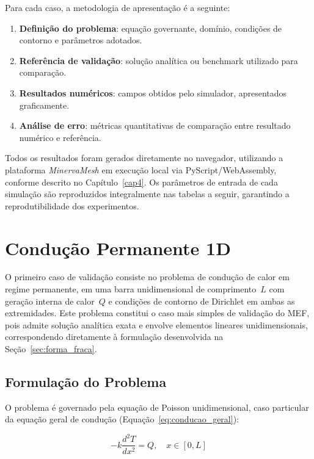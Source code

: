 Para cada caso, a metodologia de apresentação é a seguinte:
\begin{enumerate}
    \item \textbf{Definição do problema}: equação governante, domínio, condições de contorno e parâmetros adotados.
    \item \textbf{Referência de validação}: solução analítica ou benchmark utilizado para comparação.
    \item \textbf{Resultados numéricos}: campos obtidos pelo simulador, apresentados graficamente.
    \item \textbf{Análise de erro}: métricas quantitativas de comparação entre resultado numérico e referência.
\end{enumerate}

Todos os resultados foram gerados diretamente no navegador, utilizando a plataforma \textit{MinervaMesh} em execução local via PyScript/WebAssembly, conforme descrito no Capítulo~\ref{cap4}. Os parâmetros de entrada de cada simulação são reproduzidos integralmente nas tabelas a seguir, garantindo a reprodutibilidade dos experimentos.


\section{Condução Permanente 1D}
\label{sec:val_conducao1d}

O primeiro caso de validação consiste no problema de condução de calor em regime permanente, em uma barra unidimensional de comprimento~$L$ com geração interna de calor~$Q$ e condições de contorno de Dirichlet em ambas as extremidades. Este problema constitui o caso mais simples de validação do MEF, pois admite solução analítica exata e envolve elementos lineares unidimensionais, correspondendo diretamente à formulação desenvolvida na Seção~\ref{sec:forma_fraca}.

\subsection{Formulação do Problema}

O problema é governado pela equação de Poisson unidimensional, caso particular da equação geral de condução (Equação~\ref{eq:conducao_geral}):

\begin{equation}
    -k \frac{d^2 T}{dx^2} = Q, \quad x \in [0, L]
    \label{eq:val_conducao1d_edp}
\end{equation}

